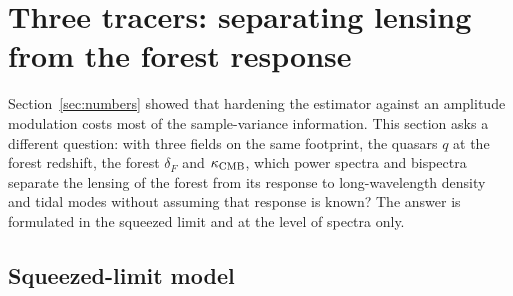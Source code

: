 \documentclass[11pt,a4paper]{article}
\newcommand{\dF}{\delta_F}
\newcommand{\kcmb}{\kappa_{\rm CMB}}
\begin{document}
\section{Three tracers: separating lensing from the forest response}
\label{sec:three}

Section~\ref{sec:numbers} showed that hardening the estimator against an amplitude modulation costs most of the sample-variance information. This section asks a different question: with three fields on the same footprint, the quasars $q$ at the forest redshift, the forest $\dF$ and $\kcmb$, which power spectra and bispectra separate the lensing of the forest from its response to long-wavelength density and tidal modes without assuming that response is known? The answer is formulated in the squeezed limit and at the level of spectra only.

\subsection{Squeezed-limit model}
\label{sec:three-model}
\end{document}
